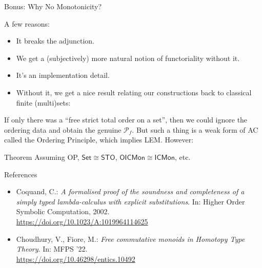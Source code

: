 \documentclass{beamer}
\begin{document}
\begin{frame}{Bonus: Why No Monotonicity?}

A few reasons:
\begin{itemize}
\item It breaks the adjunction.
\item We get a (subjectively) more natural notion of functoriality without it.
\item It's an implementation detail.
\item Without it, we get a nice result relating our constructions back to classical finite (multi)sets:
\end{itemize}

 If only there was a ``free strict total order on a set'', then we could ignore the ordering data and obtain the genuine $\mathcal{P}_{f}$.
 But such a thing is a weak form of AC called the Ordering Principle, which implies LEM.
 However:

\begin{block}{Theorem}
Assuming OP, $\mathsf{Set} \cong \mathsf{STO}$, $\mathsf{OICMon} \cong \mathsf{ICMon}$, etc.
\end{block}
\end{frame}


\begin{frame}{References}
\begin{itemize}
  \item Coquand, C.: \emph{A formalised proof of the soundness and completeness of a simply
        typed lambda-calculus with explicit substitutions}. In: Higher Order Symbolic Computation, 2002. \\
        \url{https://doi.org/10.1023/A:1019964114625}
  \item Choudhury, V., Fiore, M.: \emph{Free commutative monoids in Homotopy Type Theory}. In: MFPS '22. \\
        \url{https://doi.org/10.46298/entics.10492}
\end{itemize}
\end{frame}
\end{document}

